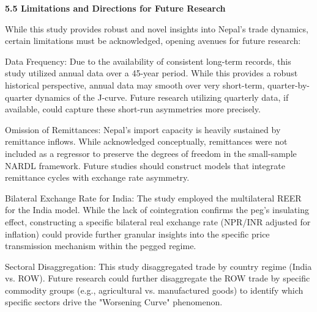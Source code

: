 \documentclass[12pt]{article}
\begin{document}
\vspace{0.5cm}
\noindent\textbf{5.5 Limitations and Directions for Future Research}

While this study provides robust and novel insights into Nepal’s trade dynamics, certain limitations must be acknowledged, opening avenues for future research:

Data Frequency: Due to the availability of consistent long-term records, this study utilized annual data over a 45-year period. While this provides a robust historical perspective, annual data may smooth over very short-term, quarter-by-quarter dynamics of the J-curve. Future research utilizing quarterly data, if available, could capture these short-run asymmetries more precisely.

Omission of Remittances: Nepal’s import capacity is heavily sustained by remittance inflows. While acknowledged conceptually, remittances were not included as a regressor to preserve the degrees of freedom in the small-sample NARDL framework. Future studies should construct models that integrate remittance cycles with exchange rate asymmetry.

Bilateral Exchange Rate for India: The study employed the multilateral REER for the India model. While the lack of cointegration confirms the peg's insulating effect, constructing a specific bilateral real exchange rate (NPR/INR adjusted for inflation) could provide further granular insights into the specific price transmission mechanism within the pegged regime.

Sectoral Disaggregation: This study disaggregated trade by country regime (India vs. ROW). Future research could further disaggregate the ROW trade by specific commodity groups (e.g., agricultural vs. manufactured goods) to identify which specific sectors drive the "Worsening Curve" phenomenon.

\newpage
\printbibliography
\end{document}
